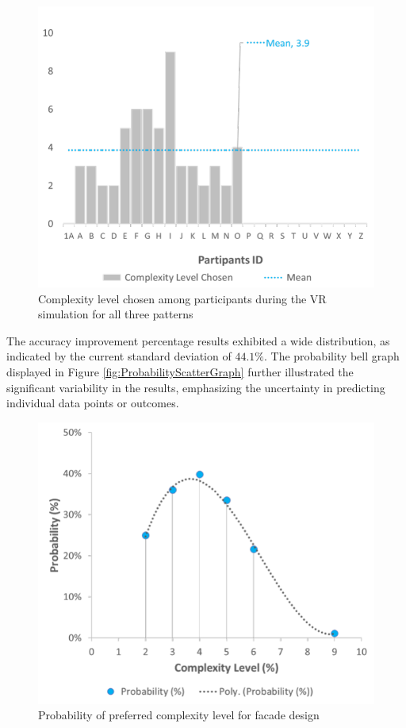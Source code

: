     \begin{figure}[htb]
        \centering
        \includegraphics[width=\linewidth]{Images/ComplexityLevelChosenChart}
        \caption{Complexity level chosen among participants during the VR simulation for all three patterns}
        \label{fig:ComplexityLevelChosenChart}
    \end{figure}


The accuracy improvement percentage results exhibited a wide distribution, as indicated by the current standard deviation of \(44.1\%\).
The probability bell graph displayed in Figure \ref{fig:ProbabilityScatterGraph} further illustrated the significant variability in the results, emphasizing the uncertainty in predicting individual data points or outcomes.


    \begin{figure}[htb]
        \centering
        \includegraphics[width=\linewidth]{Images/ProbabilityPreferredComplexitylevel}
        \caption{Probability of preferred complexity level for facade design}
        \label{fig:ProbabilityComplexitylevelChart}
    \end{figure}

